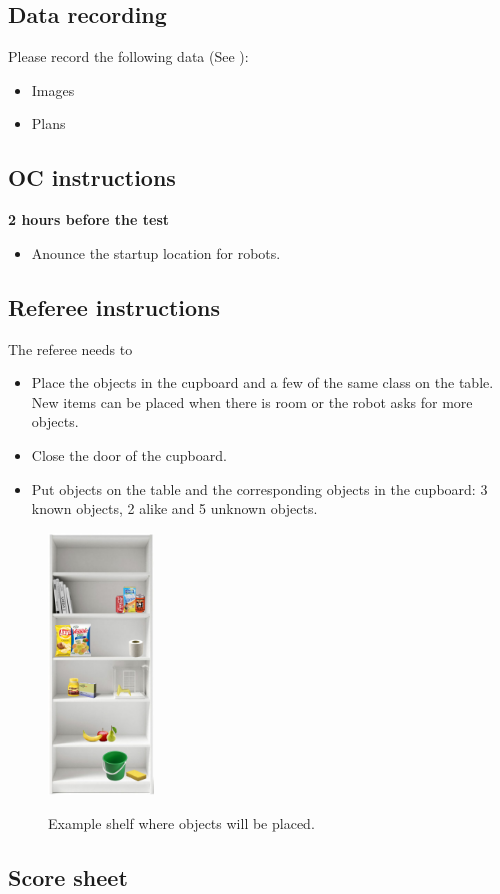 \subsection{Data recording}
  Please record the following data (See ):
  \begin{itemize}
   \item Images
   \item Plans
  \end{itemize}

\subsection{OC instructions}

\textbf{2 hours before the test}
\begin{itemize}
    \item Anounce the startup location for robots.
\end{itemize}

\subsection{Referee instructions}
The referee needs to
\begin{itemize}
\item Place the objects in the cupboard and a few of the same class on the table. New items can be placed when there is room or the robot asks for more objects. 
\item Close the door of the cupboard. 
\item Put objects on the table and the corresponding objects in the cupboard: 3 known objects, 2 alike and 5 unknown objects. 
\end{itemize}

\begin{figure}
  \centering
  \includegraphics[width=0.25\textwidth]{images/storing_groceries.png}
  \vspace{-10pt}
  \label{fig:storing_groceries}
  \caption{Example shelf where objects will be placed.}
\end{figure}

\subsection{Score sheet}


